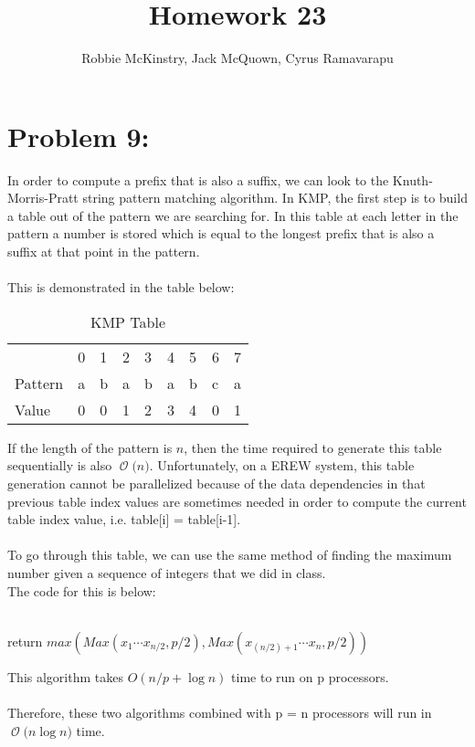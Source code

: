 \documentclass[12pt]{article}
\newcommand{\BigO}[1]{\ensuremath{\operatorname{\mathcal{O}}\bigl(#1\bigr)}}
\begin{document}
\title{Homework 23}
\author{Robbie McKinstry, Jack McQuown, Cyrus Ramavarapu}
\renewcommand{\today}{25 October 2016}
\renewcommand{\baselinestretch}{1.5}
\maketitle

\section*{Problem 9: }
In order to compute a prefix that is also a suffix, we can look to the Knuth-Morris-Pratt string pattern matching algorithm. In KMP, the first step is to build a table out of the pattern we are searching for. In this table at each letter in the pattern a number is stored which is equal to the longest prefix that is also a suffix at that point in the pattern.\\\\
This is demonstrated in the table below:\\
\begin{table}[H]
\centering
\caption{KMP Table}
\label{my-label}
\begin{tabular}{lllllllll}
                             & 0 & 1 & 2 & 3 & 4 & 5 & 6 & 7 \\ \cline{2-9} 
\multicolumn{1}{l|}{Pattern} & a & b & a & b & a & b & c & a \\
\multicolumn{1}{l|}{Value}   & 0 & 0 & 1 & 2 & 3 & 4 & 0 & 1
\end{tabular}
\end{table}
If the length of the pattern is {$n$}, then the time required to generate this table sequentially is also \BigO n. Unfortunately, on a EREW system, this table generation cannot be parallelized because of the data dependencies in that previous table index values are sometimes needed in order to compute the current table index value, i.e. table[i] = table[i-1].\\\\
To go through this table, we can use the same method of finding the maximum number given a sequence of integers that we did in class.\\
The code for this is below:\\\\
\begin{algorithm}[H]
return {$max (Max(x_1 \cdots x_{n/2}, p/2), Max(x_{(n/2) +1} \cdots x_n, p/2))$}
\end{algorithm}
This algorithm takes {$O(n/p + \log n)$} time to run on p processors.\\\\
Therefore, these two algorithms combined with p = n processors will run in \BigO{ n\log n} time.
\end{document}
